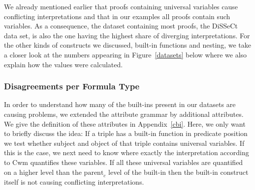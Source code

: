 We already mentioned earlier that proofs containing universal variables cause conflicting interpretations and that in our examples all proofs contain such variables.
As a consequence, the dataset containing most proofs, the DiSSeCt data set, is also the one having the highest share of diverging interpretations.
For the other kinds of constructs we discussed, built-in functions and nesting, we take a closer look at the numbers appearing in 
Figure~\ref{datasets} below where we also explain how the values were calculated. %





\subsubsection{Disagreements per Formula Type}
In order to understand how many of the built-ins present in our datasets are causing problems, 
we extended the attribute grammar by additional attributes. We give the definition of these attributes in Appendix~\ref{cbi}. Here, 
we only want to briefly discuss the idea: If a triple has a built-in function in predicate position we test whether subject and object of that triple contains universal 
variables.
If this is the case, we next need to know where exactly the interpretation according to Cwm quantifies these variables. If all these universal variables are quantified
on a higher level than the $\text{parent}_c$ level of the built-in then the built-in construct itself is not 
causing conflicting interpretations. 

